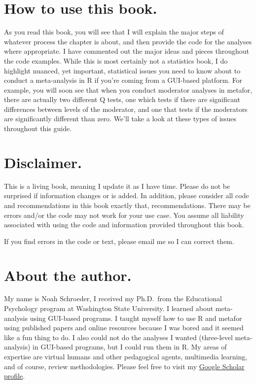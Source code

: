 \documentclass[
]{book}
\begin{document}
\hypertarget{how-to-use-this-book.}{%
\section*{How to use this book.}\label{how-to-use-this-book.}}

As you read this book, you will see that I will explain the major steps of whatever process the chapter is about, and then provide the code for the analyses where appropriate. I have commented out the major ideas and pieces throughout the code examples. While this is most certainly not a statistics book, I do highlight nuanced, yet important, statistical issues you need to know about to conduct a meta-analysis in R if you're coming from a GUI-based platform. For example, you will soon see that when you conduct moderator analyses in metafor, there are actually two different Q tests, one which tests if there are significant differences between levels of the moderator, and one that tests if the moderators are significantly different than zero. We'll take a look at these types of issues throughout this guide.

\hypertarget{disclaimer.}{%
\section*{Disclaimer.}\label{disclaimer.}}

This is a living book, meaning I update it as I have time. Please do not be surprised if information changes or is added. In addition, please consider all code and recommendations in this book exactly that, recommendations. There may be errors and/or the code may not work for your use case. You assume all liability associated with using the code and information provided throughout this book.

If you find errors in the code or text, please email me so I can correct them.

\hypertarget{about-the-author.}{%
\section*{About the author.}\label{about-the-author.}}

My name is Noah Schroeder, I received my Ph.D.~from the Educational Psychology program at Washington State University. I learned about meta-analysis using GUI-based programs. I taught myself how to use R and metafor using published papers and online resources because I was bored and it seemed like a fun thing to do. I also could not do the analyses I wanted (three-level meta-analysis) in GUI-based programs, but I could run them in R. My areas of expertise are virtual humans and other pedagogical agents, multimedia learning, and of course, review methodologies. Please feel free to visit my \href{https://scholar.google.com/citations?user=W-Ij6voAAAAJ\&hl=en\&oi=ao}{Google Scholar profile}.
\end{document}
